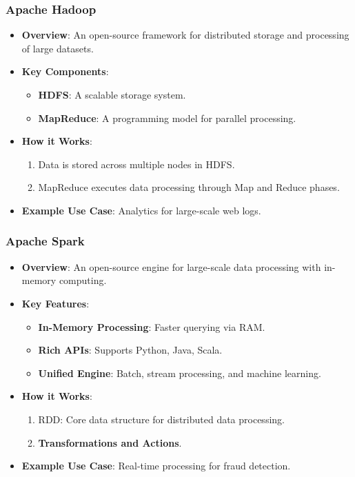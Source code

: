 \documentclass{beamer}
\begin{document}
\begin{frame}[fragile]
    \frametitle{Apache Hadoop}
    \begin{itemize}
        \item \textbf{Overview}: An open-source framework for distributed storage and processing of large datasets.
        \item \textbf{Key Components}:
        \begin{itemize}
            \item \textbf{HDFS}: A scalable storage system.
            \item \textbf{MapReduce}: A programming model for parallel processing.
        \end{itemize}
        \item \textbf{How it Works}:
        \begin{enumerate}
            \item Data is stored across multiple nodes in HDFS.
            \item MapReduce executes data processing through Map and Reduce phases.
        \end{enumerate}
        \item \textbf{Example Use Case}: Analytics for large-scale web logs.
    \end{itemize}
\end{frame}

\begin{frame}[fragile]
    \frametitle{Apache Spark}
    \begin{itemize}
        \item \textbf{Overview}: An open-source engine for large-scale data processing with in-memory computing.
        \item \textbf{Key Features}:
        \begin{itemize}
            \item \textbf{In-Memory Processing}: Faster querying via RAM.
            \item \textbf{Rich APIs}: Supports Python, Java, Scala.
            \item \textbf{Unified Engine}: Batch, stream processing, and machine learning.
        \end{itemize}
        \item \textbf{How it Works}:
        \begin{enumerate}
            \item RDD: Core data structure for distributed data processing.
            \item \textbf{Transformations and Actions}.
        \end{enumerate}
        \item \textbf{Example Use Case}: Real-time processing for fraud detection.
    \end{itemize}
\end{frame}
\end{document}
